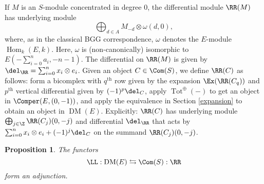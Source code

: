 \documentclass[12pt]{amsart}
\newtheorem{prop}[lemma]{Proposition}
\theoremstyle{definition}
\theoremstyle{remark}
\newcommand{\Hom}{\operatorname{Hom}} %
\def\on{\operatorname}
\def\DM{\operatorname{DM}}
\def\th{\on{th}}
\def\o{\omega}
\begin{document}
If $M$ is an $S$-module concentrated in degree 0, the differential module $\RR(M)$ has underlying module
$$
\bigoplus_{d \in A} M_{-d} \otimes \o(d, 0),
$$
where, as in the classical BGG correspondence, $\o$ denotes the $E$-module $\Hom_k(E, k)$. Here, $\o$ is (non-canonically) isomorphic to $E(-\sum_{i = 0}^n a_i, -n-1)$. The differential on $\RR(M)$ is given by $\del_\RR = \sum_{i = 0}^n x_i \otimes e_i$.
Given an object $C \in \Com(S)$, we define $\RR(C)$ as follows: form a bicomplex with $q^{\th}$ row given by the expansion $\Ex(\RR(C_q))$ and $p^{\th}$ vertical differential given by $(-1)^p\del_C$, apply $\on{Tot}^{\oplus}( - )$ to get an object in $\Comper(E, (0,-1))$, and apply the equivalence in Section \ref{expansion} to obtain an object in $\DM(E)$. Explicitly: $\RR(C)$ has underlying module $\bigoplus_{j \in \Z} \RR(C_j)(0, -j)$ and differential $\del_\RR$ that acts by $ \sum_{i = 0}^n x_i \otimes e_i + (-1)^j\del_C$ on the summand $\RR(C_j)(0, -j)$.

\iffalse
\begin{equation}
\label{bicomplex}
\xymatrix{ 
& \ar[d]^-{\del}   & \ar[d]^-{\del}   & \\
\cdots & \RR(C_q)_p\ar[l]  \ar[d]^-{ \del}     & \RR(C_{q})_{p+1}   \ar[d]^-{ \del}  \ar[l]& \cdots \ar[l]\\
\cdots & \RR(C_{q - 1})_p\ar[d]^-{\del} \ar[l] &  \RR(C_{q -1})_{p+1} \ar[d]^-{\del}  \ar[l]& \ar[l]\cdots \\
&&&
}
\end{equation}
\fi


\begin{prop}
The functors
$$
\LL :  \DM(E) \leftrightarrows \Com(S) : \RR
$$
form an adjunction.
\end{prop}
\end{document}
